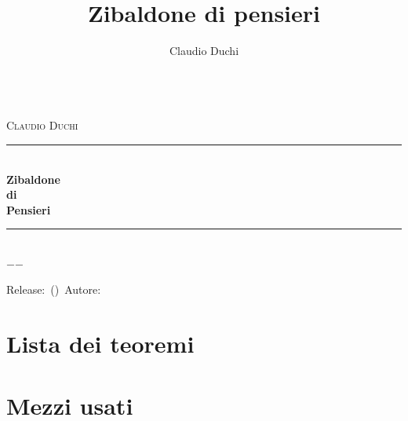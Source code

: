 \documentclass[a4paper,oneside,12pt]{book}%
\title{Zibaldone di pensieri}
\author{Claudio Duchi}
\date{\datetime}
\makeatletter
\theoremstyle{marginbreak}
\theoremstyle{marginbreak}
\theoremstyle{changebreak}
\theoremstyle{change}
\theoremstyle{change}
\theoremstyle{plain}
\theoremstyle{marginbreak}
\theoremstyle{plain}
\theoremstyle{plain}
\theoremstyle{nonumberplain}
\theoremstyle{marginbreak}
\theoremstyle{plain}
\theoremstyle{break}
\newcommand{\HRule}{\rule{\linewidth}{0.5mm}}
\renewcommand\mainmatter{%
 	\cleardoublepage
 	\@mainmattertrue
 }
\makeatother
\begin{document}
\begin{titlepage}
\begin{center}	
	\Lgrandedue\\[1cm]    
	\textsc{\LARGE Claudio Duchi}\\[1.4cm]
	\HRule \\[0.4cm]
{ \huge \bfseries Zibaldone}\\[0.4cm]
{ \large \bfseries di}\\[0.4cm]
{ \huge \bfseries Pensieri}\\[0.4cm]
\HRule \\
\vfill
		{\large $-$\DTMnow$-$}	
\end{center}
{\centering
Release:\gitReln\ (\gitAbbrevHash)\ Autore:\gitAuthorName\ 
\gitCommitterDate \\
}
\end{titlepage}	
	\hypersetup{pageanchor=true}
		\CDcopyright
		\tableofcontents
		\chapter*{Lista dei teoremi}
		\listoffigures
			\mainmatter
			

\nocite{*}
\printbibliography
 \printindex
 \appendix
 \chapter{Mezzi usati}
 \CDMezziUsati
\end{document}
